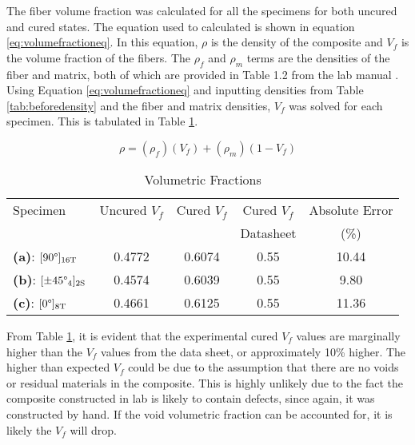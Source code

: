 
The fiber volume fraction was calculated for all the specimens for both uncured and cured states. The equation used to calculated is shown in equation \ref{eq:volumefractioneq}. In this equation, $\rho$ is the density of the composite and $V_{f}$ is the volume fraction of the fibers. The $\rho_{f}$ and $\rho_{m}$ terms are the densities of the fiber and matrix, both of which are provided in Table 1.2 from the lab manual \cite{labmanual}. Using Equation \ref{eq:volumefractioneq} and inputting densities from Table \ref{tab:beforedensity} and the fiber and matrix densities, $V_{f}$ was solved for each specimen. This is tabulated in Table \ref{tab:volume_fractions}.

\begin{equation}\label{eq:volumefractioneq}
    \rho = (\rho_{f})(V_{f}) + (\rho_{m})(1-V_{f})
\end{equation}

\begin{table}[!h]
    \centering
    \caption{Volumetric Fractions}
    \begin{tabular}{|l||c|c|c|c|}\toprule
        Specimen & Uncured $V_{f}$ & Cured $V_{f}$ & Cured $V_{f}$ & Absolute Error  \\
        & & & Datasheet & (\%) \\ \midrule
        \textbf{(a)}: $[90\degree]_{16\text{T}}$ & 0.4772 & 0.6074 & 0.55 & 10.44 \\\hline
        \textbf{(b)}: $[\pm45\degree_4]_{2\text{S}}$ & 0.4574 & 0.6039 & 0.55 & 9.80  \\\hline
        \textbf{(c)}: $[0\degree]_{8\text{T}}$ & 0.4661 & 0.6125 & 0.55 & 11.36 \\\bottomrule
    \end{tabular}
    \label{tab:volume_fractions}
\end{table}

From Table \ref{tab:volume_fractions}, it is evident that the experimental cured $V_{f}$ values are marginally higher than the $V_{f}$ values from the data sheet, or approximately 10\% higher. The higher than expected $V_{f}$ could be due to the assumption that there are no voids or residual materials in the composite. This is highly unlikely due to the fact the composite constructed in lab is likely to contain defects, since again, it was constructed by hand. If the void volumetric fraction can be accounted for, it is likely the $V_{f}$ will drop.